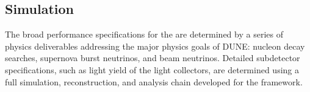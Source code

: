 %
\subsection{Simulation}
\label{sec:fdsp-pd-simphys}


The broad performance specifications for the  are determined by a series of physics deliverables addressing the major physics goals of DUNE: nucleon decay searches, supernova burst neutrinos, and beam neutrinos. Detailed subdetector specifications, such as light yield of the light collectors, are determined using a full simulation, reconstruction, and analysis chain developed for the \larsoft framework. 



